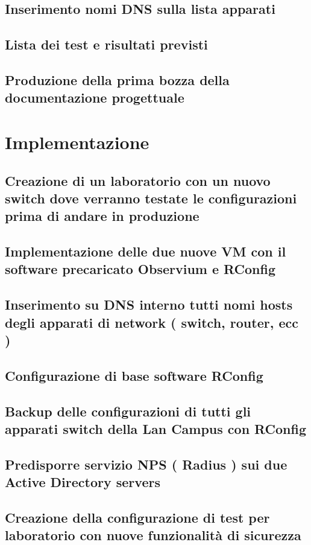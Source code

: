 \documentclass[Tesi.tex]{subfiles}
\begin{document}
\subsection{Inserimento nomi DNS sulla lista apparati}


\subsection{Lista dei test e risultati previsti}
\subsection{Produzione della prima bozza della documentazione progettuale}


\newpage
\section{Implementazione}

\subsection{Creazione di un laboratorio con un nuovo switch dove verranno testate le configurazioni prima di andare in produzione}
\subsection{Implementazione delle due nuove VM con il software precaricato Observium e RConfig}
\subsection{Inserimento su DNS interno tutti nomi hosts degli apparati di network ( switch, router, ecc )} 
\subsection{Configurazione di base software RConfig} 
\subsection{Backup delle configurazioni di tutti gli apparati switch della Lan Campus con RConfig} 
\subsection{Predisporre servizio NPS ( Radius ) sui due Active Directory servers} 
\subsection{Creazione della configurazione di test per laboratorio con nuove funzionalità di sicurezza} 
\end{document}
